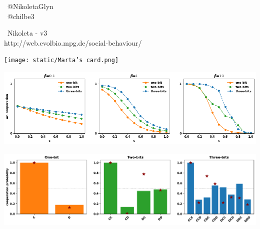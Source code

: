\documentclass{beamer}
\begin{document}
\begin{frame}
    \begin{center}
    \faTwitter \ @NikoletaGlyn \\
    \faTwitter \ @chilbe3 \\
    \vspace{1cm}

    \faGithub \ Nikoleta - v3 \\
    http://web.evolbio.mpg.de/social-behaviour/ \\
    \vspace{1cm}

    \texttt{[image: static/Marta's card.png]}
    \end{center}
\end{frame}

\begin{frame}
    \begin{center}
        
    \end{center}
\end{frame}

\begin{frame}
    \begin{center}
        \includegraphics[width=\textwidth]{static/five}
    \end{center}
\end{frame}

\begin{frame}
    \begin{center}
        \includegraphics[width=\textwidth]{static/evolution_results_barplots.pdf}
    \end{center}
\end{frame}
\end{document}
